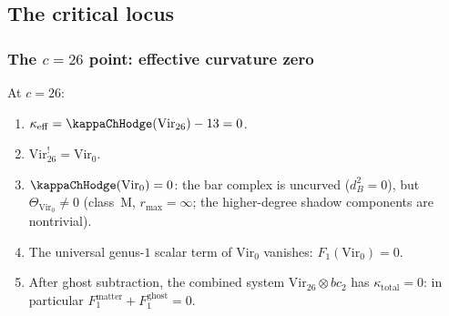 %
%

\subsection{The critical locus}

\subsubsection{The \texorpdfstring{$c = 26$}{c = 26} point:
effective curvature zero}

\begin{theorem}[The $c = 26$ degeneration; \ClaimStatusProvedHere]
At $c = 26$:
\begin{enumerate}[label=\textup{(\alph*)}]
\item $\kappa_{\mathrm{eff}} = \kappaChHodge(\mathrm{Vir}_{26}) - 13 = 0$.
\item $\mathrm{Vir}_{26}^! = \mathrm{Vir}_0$.
\item $\kappaChHodge(\mathrm{Vir}_0) = 0$: the bar complex is uncurved
 ($d_B^2 = 0$), but $\Theta_{\mathrm{Vir}_0} \neq 0$
 (class~M, $r_{\max} = \infty$; the higher-degree
 shadow components are nontrivial).
\item The universal genus-$1$ scalar term of $\mathrm{Vir}_0$ vanishes:
 $F_1(\mathrm{Vir}_0) = 0$.
\item After ghost subtraction, the combined system
 $\mathrm{Vir}_{26} \otimes bc_2$ has $\kappa_{\mathrm{total}} = 0$:
 in particular
 $F_1^{\mathrm{matter}} + F_1^{\mathrm{ghost}} = 0$.
\end{enumerate}
\end{theorem}

